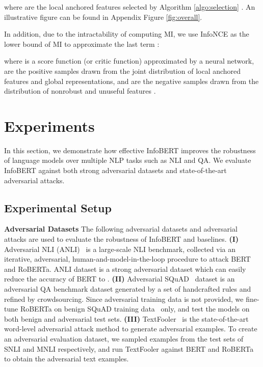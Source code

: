 \documentclass{article} \usepackage{iclr2021_conference,times}
\theoremstyle{definition}
\theoremstyle{remark}
\newcommand{\method}{InfoBERT\xspace}
\newcommand{\modified}[1]{{\color{black}{#1}}}
\begin{document}
where  are the local anchored features selected by Algorithm \ref{algo:selection} \modified{and  is the number of local anchored features}. An illustrative figure can be found in Appendix Figure \ref{fig:overall}.

In addition, due to the intractability of computing MI, we use InfoNCE \citep{infonce} as the lower bound of MI to approximate the last term :

where  is a score function (or critic function) approximated by a neural network,  are the positive samples drawn from the joint distribution  of local anchored features and global representations,  and  are the negative samples drawn from  the distribution of nonrobust and unuseful features . \section{Experiments}\label{sec:exp}
In this section, we demonstrate how effective \method improves the robustness of language models over multiple NLP tasks such as NLI and QA. We evaluate \method against both strong adversarial datasets and state-of-the-art adversarial attacks.\subsection{Experimental Setup}
\textbf{Adversarial Datasets} The following adversarial datasets and adversarial attacks are used to evaluate the robustness of \method and baselines.
\textbf{(I)} Adversarial NLI (ANLI)~\citep{anli} is a large-scale NLI benchmark, collected via an iterative, adversarial, human-and-model-in-the-loop procedure to attack BERT and RoBERTa. ANLI dataset is a strong adversarial dataset which can easily reduce the  accuracy of BERT to . 
\textbf{(II)} Adversarial SQuAD~\citep{advsquad} dataset is an adversarial QA benchmark dataset generated by a set of handcrafted rules and refined by crowdsourcing. Since adversarial training data is not provided, we fine-tune RoBERTa on benign SQuAD training data~\citep{squad} only, and test the models on both benign and adversarial test sets. 
\textbf{(III)} TextFooler~\citep{textfooler} is the state-of-the-art word-level adversarial attack method to generate adversarial examples. To create an adversarial evaluation dataset, we sampled  examples from the test sets of SNLI and MNLI respectively, and run TextFooler against BERT and RoBERTa to obtain the adversarial text examples.
\end{document}
